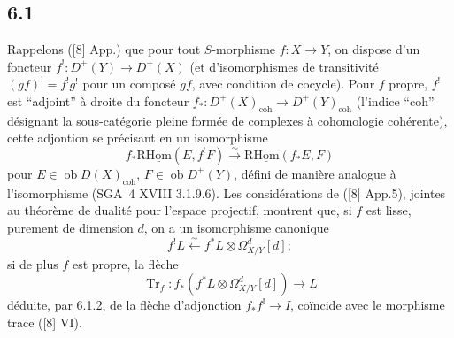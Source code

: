 \subsection*{6.1}
Rappelons ([8] App.) que pour tout $S$-morphisme $f:X\to Y$, on dispose d'un foncteur $f^!:D^+(Y)\longrightarrow D^+(X)$ (et d'isomorphismes de transitivité $(gf)^! = f^!g^!$ pour un composé $gf$, avec condition de cocycle). Pour $f$ propre, $f^!$ est ``adjoint'' à droite du foncteur $f_*:D^+(X)_{\mathrm{coh}}\to D^+(Y)_{\mathrm{coh}}$ (l'indice ``coh'' désignant la sous-catégorie pleine formée de complexes à cohomologie cohérente), cette adjontion se précisant en un isomorphisme
\begin{equation}
\tag{6.1.1}
f_*\mathrm{R}\underline{\mathrm{Hom}}(E,f^!F)\xrightarrow{\sim}\mathrm{R}\underline{\mathrm{Hom}}(f_*E,F)
\end{equation}
pour $E\in\operatorname{ob}D(X)_{\mathrm{coh}}$, $F\in\operatorname{ob}D^+(Y)$, défini de manière analogue à l'isomorphisme (SGA~4 XVIII 3.1.9.6). Les considérations de ([8] App.5), jointes au théorème de dualité pour l'espace projectif, montrent que, si $f$ est lisse, purement de dimension $d$, on a un isomorphisme canonique
\begin{equation}
\tag{6.1.2}
f^!L\xleftarrow{\sim} f^*L\otimes\Omega^d_{X/Y}[d];
\end{equation}
si de plus $f$ est propre, la flèche
\begin{equation}
\tag{6.1.3}
\operatorname{Tr}_f:f_*(f^*L\otimes\Omega^d_{X/Y}[d])\longrightarrow L
\end{equation}
déduite, par 6.1.2, de la flèche d'adjonction $f_*f^!\to I$, coïncide avec le morphisme trace ([8] VI).

